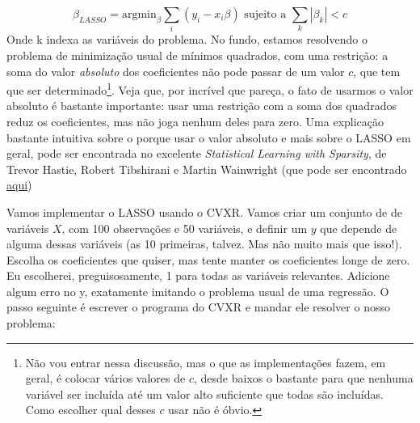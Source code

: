 \documentclass[]{book}
\let\rmarkdownfootnote\footnote%
\def\footnote{\protect\rmarkdownfootnote}
\begin{document}
\[\beta_{LASSO} = \text{argmin}_\beta \sum_i (y_i - x_i\beta) \text{ sujeito a } \sum_k |\beta_k| < c\]
Onde k indexa as variáveis do problema. No fundo, estamos resolvendo o
problema de minimização usual de mínimos quadrados, com uma restrição: a
soma do valor \emph{absoluto} dos coeficientes não pode passar de um
valor \(c\), que tem que ser determinado\footnote{Não vou entrar nessa
  discussão, mas o que as implementações fazem, em geral, é colocar
  vários valores de \(c\), desde baixos o bastante para que nenhuma
  variável ser incluída até um valor alto suficiente que todas são
  incluídas. Como escolher qual desses \(c\) usar não é óbvio.}. Veja
que, por incrível que pareça, o fato de usarmos o valor absoluto é
bastante importante: usar uma restrição com a soma dos quadrados reduz
os coeficientes, mas não joga nenhum deles para zero. Uma explicação
bastante intuitiva sobre o porque usar o valor absoluto e mais sobre o
LASSO em geral, pode ser encontrada no excelente \emph{Statistical
Learning with Sparsity}, de Trevor Hastie, Robert Tibshirani e Martin
Wainwright (que pode ser encontrado
\href{https://web.stanford.edu/~hastie/StatLearnSparsity_files/SLS_corrected_1.4.16.pdf}{aqui})

Vamos implementar o LASSO usando o CVXR. Vamos criar um conjunto de de
variáveis \(X\), com 100 observações e 50 variáveis, e definir um \(y\)
que depende de alguma dessas variáveis (as 10 primeiras, talvez. Mas não
muito mais que isso!). Escolha os coeficientes que quiser, mas tente
manter os coeficientes longe de zero. Eu escolherei, preguisosamente, 1
para todas as variáveis relevantes. Adicione algum erro no y, exatamente
imitando o problema usual de uma regressão. O passo seguinte é escrever
o programa do CVXR e mandar ele resolver o nosso problema:
\end{document}
